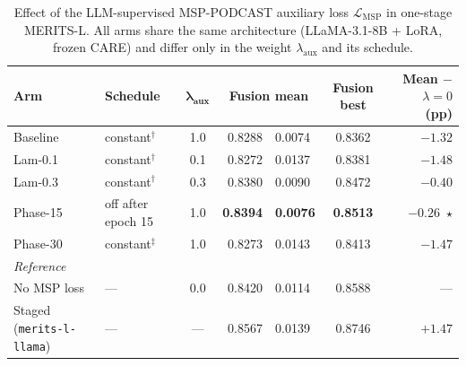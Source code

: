 %

\begin{table}[t]
\centering
\caption{Effect of the LLM-supervised MSP-PODCAST auxiliary loss
$\mathcal{L}_{\text{MSP}}$ in one-stage MERITS-L. All arms share the same
architecture (LLaMA-3.1-8B + LoRA, frozen CARE) and differ only in the weight
$\lambda_{\text{aux}}$ and its schedule.}
\label{tab:msp-lambda}
\begin{tabular}{llcr@{\;$\pm$\;}lcr}
\toprule
\textbf{Arm} & \textbf{Schedule} & $\boldsymbol{\lambda_{\text{aux}}}$ &
\multicolumn{2}{c}{\textbf{Fusion mean}} & \textbf{Fusion best} &
\textbf{Mean $-$ $\lambda{=}0$ (pp)} \\
\midrule
Baseline  & constant$^{\dagger}$      & 1.0 & 0.8288 & 0.0074 & 0.8362 & $-1.32$ \\
Lam-0.1   & constant$^{\dagger}$      & 0.1 & 0.8272 & 0.0137 & 0.8381 & $-1.48$ \\
Lam-0.3   & constant$^{\dagger}$      & 0.3 & 0.8380 & 0.0090 & 0.8472 & $-0.40$ \\
Phase-15  & off after epoch 15        & 1.0 & \textbf{0.8394} & \textbf{0.0076} & \textbf{0.8513} & $\mathbf{-0.26}$~$\star$ \\
Phase-30  & constant$^{\ddagger}$     & 1.0 & 0.8273 & 0.0143 & 0.8413 & $-1.47$ \\
\midrule
\multicolumn{7}{l}{\textit{Reference}} \\
No MSP loss & ---                     & 0.0 & 0.8420 & 0.0114 & 0.8588 & --- \\
Staged (\texttt{merits-l-llama}) & --- & --- & 0.8567 & 0.0139 & 0.8746 & $+1.47$ \\
\bottomrule
\end{tabular}


\end{table}
